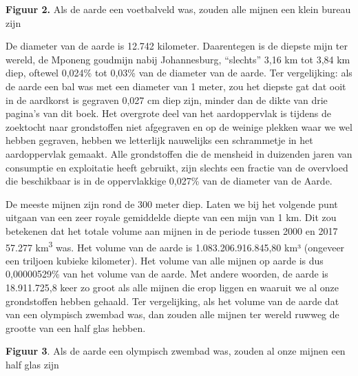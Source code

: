 \textbf{Figuur 2.} Als de aarde een voetbalveld was, zouden alle mijnen
een klein bureau zijn

De diameter van de aarde is 12.742 kilometer. Daarentegen is de diepste
mijn ter wereld, de Mponeng goudmijn nabij Johannesburg, \enquote{slechts} 3,16 km
tot 3,84 km diep, oftewel 0,024\% tot 0,03\% van de diameter van de
aarde. Ter vergelijking: als de aarde een bal was met een diameter van 1
meter, zou het diepste gat dat ooit in de aardkorst is gegraven 0,027 cm
diep zijn, minder dan de dikte van drie pagina's van dit boek. Het
overgrote deel van het aardoppervlak is tijdens de zoektocht naar
grondstoffen niet afgegraven en op de weinige plekken waar we wel hebben
gegraven, hebben we letterlijk nauwelijks een schrammetje in het
aardoppervlak gemaakt. Alle grondstoffen die de mensheid in duizenden
jaren van consumptie en exploitatie heeft gebruikt, zijn slechts een
fractie van de overvloed die beschikbaar is in de oppervlakkige 0,027\%
van de diameter van de Aarde.

De meeste mijnen zijn rond de 300 meter diep. Laten we bij het volgende
punt uitgaan van een zeer royale gemiddelde diepte van een mijn van 1
km. Dit zou betekenen dat het totale volume aan mijnen in de periode
tussen 2000 en 2017 57.277 km\textsuperscript{3} was. Het volume van de aarde is
1.083.206.916.845,80 km³ (ongeveer een triljoen kubieke kilometer). Het
volume van alle mijnen op aarde is dus 0,00000529\% van het volume van
de aarde. Met andere woorden, de aarde is 18.911.725,8 keer zo groot als
alle mijnen die erop liggen en waaruit we al onze grondstoffen hebben
gehaald. Ter vergelijking, als het volume van de aarde dat van een
olympisch zwembad was, dan zouden alle mijnen ter wereld ruwweg de
grootte van een half glas hebben.\autocite{32}

\textbf{Figuur 3}. Als de aarde een olympisch zwembad was, zouden al
onze mijnen een half glas zijn

